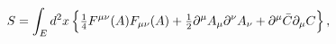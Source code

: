 \begin{equation}
\label{1.1}
S = \int_E d^2x\, \Bigr\{
\hbox{$\frac{1}{4}$} F^{\mu\nu}(A) F_{\mu\nu}(A) +
\hbox{$\frac{1}{2}$} \partial^\mu A_\mu \partial^\nu A_\nu +
\partial^\mu \bar{C} \partial_\mu C \Bigr\}\,,
\end{equation}

